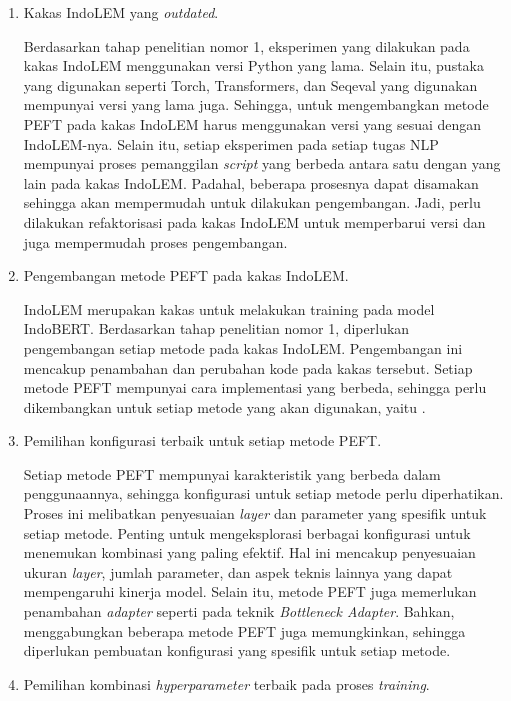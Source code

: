 \begin{enumerate}
    \item Kakas IndoLEM yang \textit{outdated}.
    
    Berdasarkan tahap penelitian nomor 1, eksperimen yang dilakukan pada kakas IndoLEM menggunakan versi Python yang lama. Selain itu, pustaka yang digunakan seperti Torch, Transformers, dan Seqeval yang digunakan mempunyai versi yang lama juga. Sehingga, untuk mengembangkan metode PEFT pada kakas IndoLEM harus menggunakan versi yang sesuai dengan IndoLEM-nya. Selain itu, setiap eksperimen pada setiap tugas NLP mempunyai proses pemanggilan \textit{script} yang berbeda antara satu dengan yang lain pada kakas IndoLEM. Padahal, beberapa prosesnya dapat disamakan sehingga akan mempermudah untuk dilakukan pengembangan. Jadi, perlu dilakukan refaktorisasi pada kakas IndoLEM untuk memperbarui versi dan juga mempermudah proses pengembangan. 

    \item Pengembangan metode PEFT pada kakas IndoLEM.
    
    IndoLEM merupakan kakas untuk melakukan training pada model IndoBERT. Berdasarkan tahap penelitian nomor 1, diperlukan pengembangan setiap metode pada kakas IndoLEM. Pengembangan ini mencakup penambahan dan perubahan kode pada kakas tersebut. Setiap metode PEFT mempunyai cara implementasi yang berbeda, sehingga perlu dikembangkan untuk setiap metode yang akan digunakan, yaitu \methodPEFT.

    \item Pemilihan konfigurasi terbaik untuk setiap metode PEFT.
    
    Setiap metode PEFT mempunyai karakteristik yang berbeda dalam penggunaannya, sehingga konfigurasi untuk setiap metode perlu diperhatikan. Proses ini melibatkan penyesuaian \textit{layer} dan parameter yang spesifik untuk setiap metode. Penting untuk mengeksplorasi berbagai konfigurasi untuk menemukan kombinasi yang paling efektif. Hal ini mencakup penyesuaian ukuran \textit{layer}, jumlah parameter, dan aspek teknis lainnya yang dapat mempengaruhi kinerja model. Selain itu, metode PEFT juga memerlukan penambahan \textit{adapter} seperti pada teknik \textit{Bottleneck Adapter}. Bahkan, menggabungkan beberapa metode PEFT juga memungkinkan, sehingga diperlukan pembuatan konfigurasi yang spesifik untuk setiap metode.

    \item Pemilihan kombinasi \textit{hyperparameter} terbaik pada proses \textit{training}.
    

\end{enumerate}
